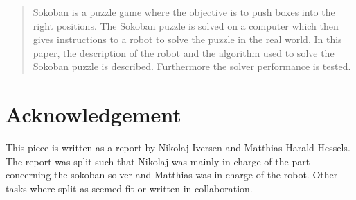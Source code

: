 \begin{abstract}
  Sokoban is a puzzle game where the objective is to push boxes into the right positions.
  The Sokoban puzzle is solved on a computer which then gives instructions to a robot to solve the puzzle in the real world.
  In this paper, the description of the robot and the algorithm used to solve the Sokoban puzzle is described.
  Furthermore the solver performance is tested.
\end{abstract}

\section{Acknowledgement}
This piece is written as a report by Nikolaj Iversen and Matthias Harald Hessels. The report was
split such that Nikolaj was mainly in charge of the part concerning the sokoban solver
and Matthias was in charge of the robot. Other tasks where split as seemed fit or written
in collaboration.

